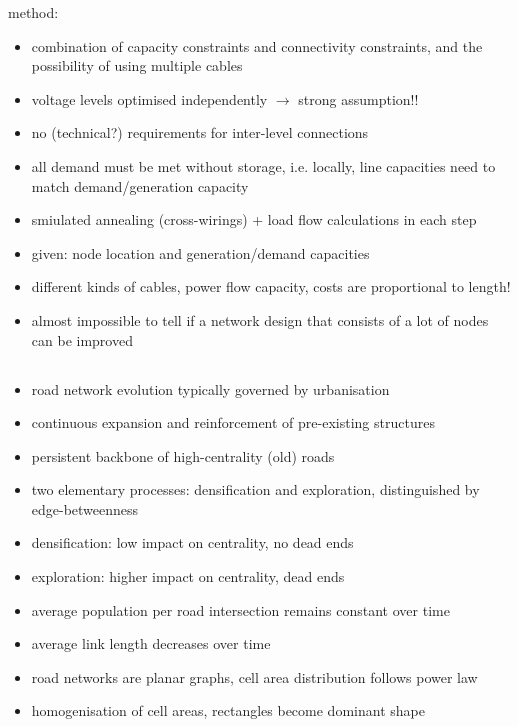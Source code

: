 \documentclass[paper=a4, fontsize=12pt]{article}
\begin{document}
method:
\begin{itemize}
\item combination of capacity constraints and connectivity constraints, and the possibility of using multiple cables

\item voltage levels optimised independently $\rightarrow$ strong assumption!!
\item no (technical?) requirements for inter-level connections
\item all demand must be met without storage, i.e. locally, line capacities need to match demand/generation capacity
\item smiulated annealing (cross-wirings) + load flow calculations in each step

\item given: node location and generation/demand capacities
\item different kinds of cables, power flow capacity, costs are proportional to length!

\item almost impossible to tell if a network design that consists of a lot of nodes can be improved

\end{itemize}

\subsection*{\citeauthor{Strano2012} \cite{Strano2012}}

\begin{itemize}
\item road network evolution typically governed by urbanisation
\item continuous expansion and reinforcement of pre-existing structures
\item persistent backbone of high-centrality (old) roads
\item two elementary processes: densification and exploration, distinguished by edge-betweenness
\item densification: low impact on centrality, no dead ends
\item exploration: higher impact on centrality, dead ends

\item average population per road intersection remains constant over time
\item average link length decreases over time

\item road networks are planar graphs, cell area distribution follows power law
\item homogenisation of cell areas, rectangles become dominant shape
\end{itemize}
\end{document}
